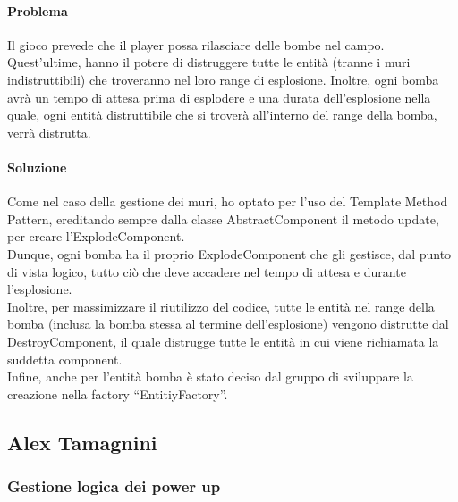 \documentclass[a4paper,12pt]{report}
\begin{document}
\paragraph{Problema} Il gioco prevede che il player possa rilasciare delle bombe nel campo. Quest’ultime, hanno il potere di distruggere tutte le entità (tranne i muri indistruttibili) che troveranno nel loro range di esplosione. Inoltre, ogni bomba avrà un tempo di attesa prima di esplodere e una durata dell’esplosione nella quale, ogni entità distruttibile che si troverà all’interno del range della bomba, verrà distrutta.

\paragraph{Soluzione} Come nel caso della gestione dei muri, ho optato per l’uso del Template Method Pattern, ereditando sempre dalla classe AbstractComponent il metodo update, per creare l’ExplodeComponent.
\\
Dunque, ogni bomba ha il proprio ExplodeComponent che gli gestisce, dal punto di vista logico, tutto ciò che deve accadere nel tempo di attesa e durante l’esplosione.
\\
Inoltre, per massimizzare il riutilizzo del codice, tutte le entità nel range della bomba (inclusa la bomba stessa al termine dell’esplosione) vengono distrutte dal DestroyComponent, il quale distrugge tutte le entità in cui viene richiamata la suddetta component.
\\
Infine, anche per l’entità bomba è stato deciso dal gruppo di sviluppare la creazione nella factory “EntitiyFactory”.

\subsection*{Alex Tamagnini}

\subsubsection{Gestione logica dei power up}
\end{document}
